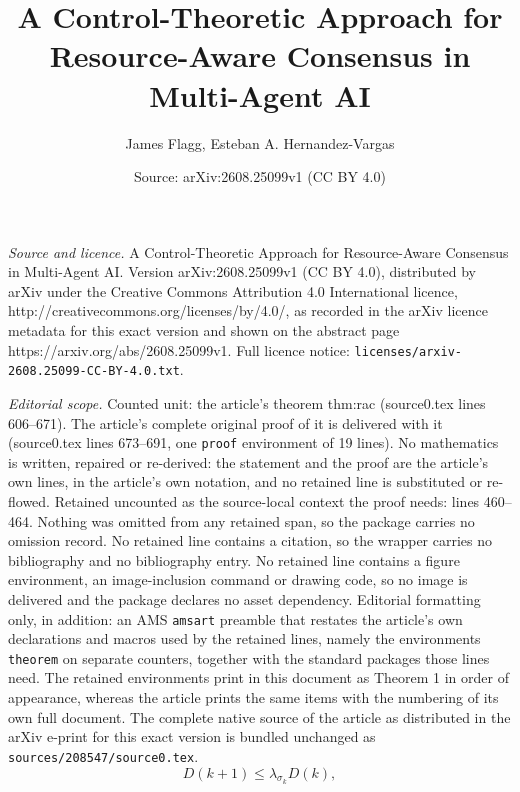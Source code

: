 \documentclass[10pt,a4paper]{amsart}
\title{A Control-Theoretic Approach for Resource-Aware Consensus in Multi-Agent AI}
\author{James Flagg, Esteban A. Hernandez-Vargas}
\date{Source: arXiv:2608.25099v1 (CC BY 4.0)}
\begin{document}
\maketitle

\noindent\emph{Source and licence.} A Control-Theoretic Approach for Resource-Aware Consensus in Multi-Agent AI. Version arXiv:2608.25099v1 (CC BY 4.0), distributed by arXiv under the Creative Commons Attribution 4.0 International licence, http://creativecommons.org/licenses/by/4.0/, as recorded in the arXiv licence metadata for this exact version and shown on the abstract page https://arxiv.org/abs/2608.25099v1. Full licence notice: \texttt{licenses/arxiv-2608.25099-CC-BY-4.0.txt}.\par\smallskip

\noindent\textit{Editorial scope.} Counted unit: the article's theorem thm:rac (source0.tex lines 606--671). The article's complete original proof of it is delivered with it (source0.tex lines 673--691, one \texttt{proof} environment of 19 lines). No mathematics is written, repaired or re-derived: the statement and the proof are the article's own lines, in the article's own notation, and no retained line is substituted or re-flowed.  Retained uncounted as the source-local context the proof needs: lines 460--464.  Nothing was omitted from any retained span, so the package carries no omission record.  No retained line contains a citation, so the wrapper carries no bibliography and no bibliography entry.  No retained line contains a figure environment, an image-inclusion command or drawing code, so no image is delivered and the package declares no asset dependency.  Editorial formatting only, in addition: an AMS \texttt{amsart} preamble that restates the article's own declarations and macros used by the retained lines, namely the environments \texttt{theorem} on separate counters, together with the standard packages those lines need.  The retained environments print in this document as Theorem 1 in order of appearance, whereas the article prints the same items with the numbering of its own full document.  The complete native source of the article as distributed in the arXiv e-print for this exact version is bundled unchanged as \texttt{sources/208547/source0.tex}.
\begin{equation} \label{eq:contracting}
D(k+1)
\le
\lambda_{\sigma_k}D(k),
\end{equation}
\end{document}
